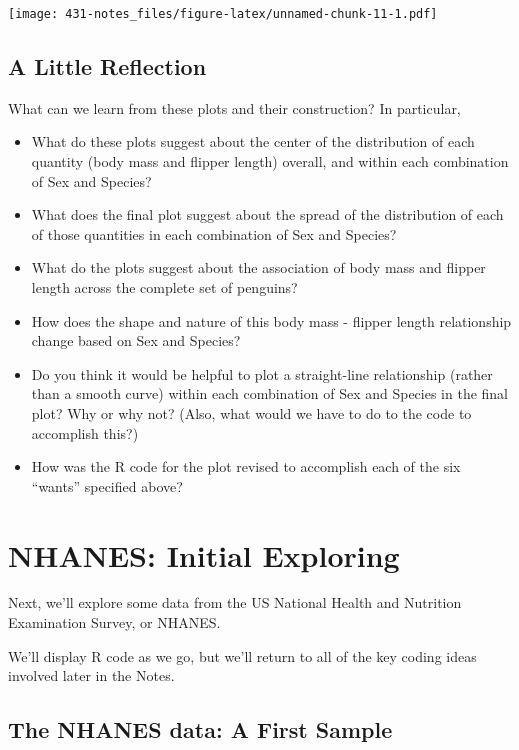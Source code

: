 \documentclass[
]{book}
\providecommand{\tightlist}{%
  \setlength{\itemsep}{0pt}\setlength{\parskip}{0pt}}
\begin{document}
\texttt{[image: 431-notes\_files/figure-latex/unnamed-chunk-11-1.pdf]}

\hypertarget{a-little-reflection}{%
\section{A Little Reflection}\label{a-little-reflection}}

What can we learn from these plots and their construction? In particular,

\begin{itemize}
\tightlist
\item
  What do these plots suggest about the center of the distribution of each quantity (body mass and flipper length) overall, and within each combination of Sex and Species?
\item
  What does the final plot suggest about the spread of the distribution of each of those quantities in each combination of Sex and Species?
\item
  What do the plots suggest about the association of body mass and flipper length across the complete set of penguins?
\item
  How does the shape and nature of this body mass - flipper length relationship change based on Sex and Species?
\item
  Do you think it would be helpful to plot a straight-line relationship (rather than a smooth curve) within each combination of Sex and Species in the final plot? Why or why not? (Also, what would we have to do to the code to accomplish this?)
\item
  How was the R code for the plot revised to accomplish each of the six ``wants'' specified above?
\end{itemize}

\hypertarget{dataviz}{%
\chapter{NHANES: Initial Exploring}\label{dataviz}}

Next, we'll explore some data from the US National Health and Nutrition Examination Survey, or NHANES.

We'll display R code as we go, but we'll return to all of the key coding ideas involved later in the Notes.

\hypertarget{the-nhanes-data-a-first-sample}{%
\section{The NHANES data: A First Sample}\label{the-nhanes-data-a-first-sample}}
\end{document}
